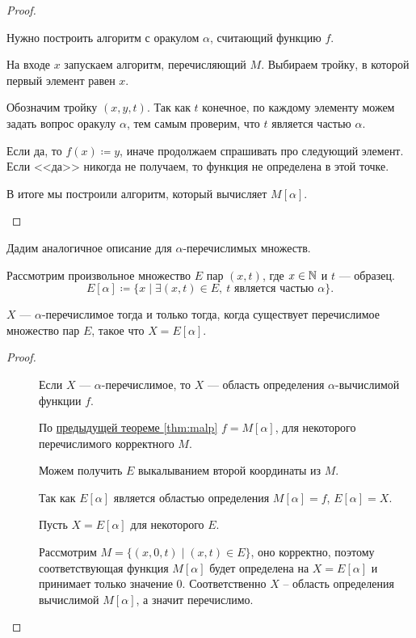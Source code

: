 \begin{proof}
\begin{description}
		   Нужно построить алгоритм с оракулом $ \alpha $, считающий функцию $ f$.

		   На входе $ x$ запускаем алгоритм, перечисляющий  $ M$. Выбираем тройку, в которой первый элемент равен $ x$. 

		   Обозначим тройку $ (x, y, t)$. Так как  $ t$ конечное, по каждому элементу можем задать вопрос оракулу  $  \alpha $, тем самым проверим, что $ t$ является частью $  \alpha $.

		   Если да, то $ f(x) \coloneqq y$, иначе продолжаем спрашивать про следующий элемент.
		   Если <<да>> никогда не получаем, то функция не определена в этой точке.

		   В итоге мы построили алгоритм, который вычисляет $ M[ \alpha ]$.
   \end{description} 
\end{proof}

Дадим аналогичное описание для $\alpha$-перечислимых множеств.

\begin{defn}
	Рассмотрим произвольное множество $ E$ пар  $ (x, t)$, где  $ x \in \mathbb{N}$ и $ t$ --- образец.
	\[
		E[ \alpha ] \coloneqq \{x \mid \exists (x, t) \in E, ~ t \text{ является частью } \alpha \}
	.\] 
\end{defn}

\begin{thm}
	$ X$ --- $  \alpha $-перечислимое тогда и только тогда, когда существует перечислимое множество пар $ E$, такое что  $ X = E[ \alpha ]$.
\end{thm}
\begin{proof}
    ~\begin{description}
		\item[]
			Если $ X$ ---  $  \alpha $-перечислимое, то $ X$ --- область определения  $  \alpha $-вычислимой функции $ f$. 
			
			По \hyperref[thm:malp]{предыдущей теореме \ref{thm:malp}} $ f = M[ \alpha ]$, для некоторого перечислимого корректного $ M$.

			Можем получить  $ E$ выкалыванием второй координаты из $ M$.

			Так как $ E[ \alpha ]$ является областью определения $ M[ \alpha ] = f$, $ E[ \alpha ] = X$.
        \item[]
			Пусть $ X = E[ \alpha ]$ для некоторого $ E$.

			Рассмотрим  $ M = \{(x, 0, t) \mid (x, t) \in  E\}$, оно корректно, поэтому соответствующая функция $ M[ \alpha ]$ будет определена на $ X = E[ \alpha ]$ и принимает только значение $ 0$. Соответственно $X$ -- область определения вычислимой $M[\alpha]$, а значит перечислимо.
    \end{description} 
\end{proof}

